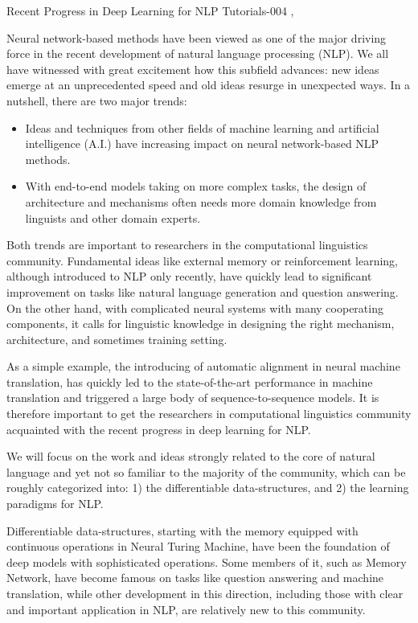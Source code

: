 \begin{tutorial}
  {Recent Progress in Deep Learning for NLP}
  {Tutorials-004}
  {\daydateyear, \tutorialafternoontime}
  {\TutLocD}

Neural network-based methods have been viewed as one of the major driving force in the recent development of natural language processing (NLP). We all have witnessed with great excitement how this subfield advances: new ideas emerge at an unprecedented speed and old ideas resurge in unexpected ways. In a nutshell, there are two major trends:

\begin{itemize}
\item Ideas and techniques from other fields of machine learning and artificial intelligence (A.I.) have increasing impact on neural network-based NLP methods.
\item With end-to-end models taking on more complex tasks, the design of architecture and mechanisms often needs more domain knowledge from linguists and other domain experts.
\end{itemize}

Both trends are important to researchers in the computational linguistics community. Fundamental ideas like external memory or reinforcement learning, although introduced to NLP only recently, have quickly lead to significant improvement on tasks like natural language generation and question answering. On the other hand, with complicated neural systems with many cooperating components, it calls for linguistic knowledge in designing the right mechanism, architecture, and sometimes training setting.

As a simple example, the introducing of automatic alignment in neural machine translation, has quickly led to the state-of-the-art performance in machine translation and triggered a large body of sequence-to-sequence models. It is therefore important to get the researchers in computational linguistics community acquainted with the recent progress in deep learning for NLP.

We will focus on the work and ideas strongly related to the core of natural language and yet not so familiar to the majority of the community, which can be roughly categorized into: 1) the differentiable data-structures, and 2) the learning paradigms for NLP.

Differentiable data-structures, starting with the memory equipped with continuous operations in Neural Turing Machine, have been the foundation of deep models with sophisticated operations. Some members of it, such as Memory Network, have become famous on tasks like question answering and machine translation, while other development in this direction, including those with clear and important application in NLP, are relatively new to this community.


\end{tutorial}
